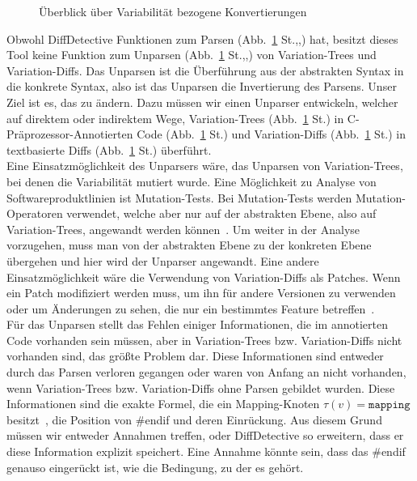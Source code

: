 \begin{figure}[h]
	\centering
	\vaShow
	\caption{Überblick über Variabilität bezogene Konvertierungen}
	\label{fig:1}
\end{figure}


Obwohl DiffDetective Funktionen zum Parsen (Abb.~\ref{fig:1} St.,,) hat, besitzt dieses Tool keine Funktion zum Unparsen (Abb.~\ref{fig:1} St.,,) von Variation-Trees und Variation-Diffs. Das Unparsen ist die Überführung aus der abstrakten Syntax in die konkrete Syntax, also ist das Unparsen die Invertierung des Parsens. Unser Ziel ist es, das zu ändern. Dazu müssen wir einen Unparser entwickeln, welcher auf direktem oder indirektem Wege, Variation-Trees (Abb.~\ref{fig:1} St.) in C-Präprozessor-Annotierten Code (Abb.~\ref{fig:1} St.) und Variation-Diffs (Abb.~\ref{fig:1} St.) in textbasierte Diffs (Abb.~\ref{fig:1} St.) überführt.\\

Eine Einsatzmöglichkeit des Unparsers wäre, das Unparsen von Variation-Trees, bei denen die Variabilität mutiert wurde. Eine Möglichkeit zu Analyse von Softwareproduktlinien ist Mutation-Tests. Bei Mutation-Tests werden Mutation-Operatoren verwendet, welche aber nur auf der abstrakten Ebene, also auf Variation-Trees, angewandt werden können~\cite{ABT+:VaMoS16}. Um weiter in der Analyse vorzugehen, muss man von der abstrakten Ebene zu der konkreten Ebene übergehen und hier wird der Unparser angewandt. Eine andere Einsatzmöglichkeit wäre die Verwendung von Variation-Diffs als Patches. Wenn ein Patch modifiziert werden muss, um ihn für andere Versionen zu verwenden oder um Änderungen zu sehen, die nur ein bestimmtes Feature betreffen~\cite{BSG+:SPLC23}.\\


Für das Unparsen stellt das Fehlen einiger Informationen, die im annotierten Code vorhanden sein müssen, aber in Variation-Trees bzw. Variation-Diffs nicht vorhanden sind, das größte Problem dar. Diese Informationen sind entweder durch das Parsen verloren gegangen oder waren von Anfang an nicht vorhanden, wenn Variation-Trees bzw. Variation-Diffs ohne Parsen gebildet wurden. Diese Informationen sind die exakte Formel, die ein Mapping-Knoten $\tau(v) = \texttt{mapping}$ besitzt~\cite{BTS+:ESECFSE22}, die Position von \#endif und deren Einrückung. Aus diesem Grund müssen wir entweder Annahmen treffen, oder DiffDetective so erweitern, dass er diese Information explizit speichert. Eine Annahme könnte sein, dass das \#endif genauso eingerückt ist, wie die Bedingung, zu der es gehört.\\

